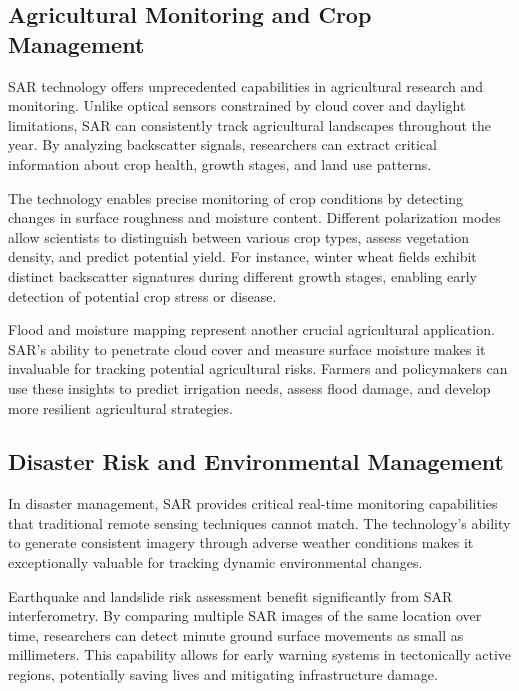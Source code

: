 \documentclass[
  letterpaper,
]{scrbook}
\begin{document}
\subsection{Agricultural Monitoring and Crop
Management}\label{agricultural-monitoring-and-crop-management}

SAR technology offers unprecedented capabilities in agricultural
research and monitoring. Unlike optical sensors constrained by cloud
cover and daylight limitations, SAR can consistently track agricultural
landscapes throughout the year. By analyzing backscatter signals,
researchers can extract critical information about crop health, growth
stages, and land use patterns.

The technology enables precise monitoring of crop conditions by
detecting changes in surface roughness and moisture content. Different
polarization modes allow scientists to distinguish between various crop
types, assess vegetation density, and predict potential yield. For
instance, winter wheat fields exhibit distinct backscatter signatures
during different growth stages, enabling early detection of potential
crop stress or disease.

Flood and moisture mapping represent another crucial agricultural
application. SAR's ability to penetrate cloud cover and measure surface
moisture makes it invaluable for tracking potential agricultural risks.
Farmers and policymakers can use these insights to predict irrigation
needs, assess flood damage, and develop more resilient agricultural
strategies.

\subsection{Disaster Risk and Environmental
Management}\label{disaster-risk-and-environmental-management}

In disaster management, SAR provides critical real-time monitoring
capabilities that traditional remote sensing techniques cannot match.
The technology's ability to generate consistent imagery through adverse
weather conditions makes it exceptionally valuable for tracking dynamic
environmental changes.

Earthquake and landslide risk assessment benefit significantly from SAR
interferometry. By comparing multiple SAR images of the same location
over time, researchers can detect minute ground surface movements as
small as millimeters. This capability allows for early warning systems
in tectonically active regions, potentially saving lives and mitigating
infrastructure damage.
\end{document}
